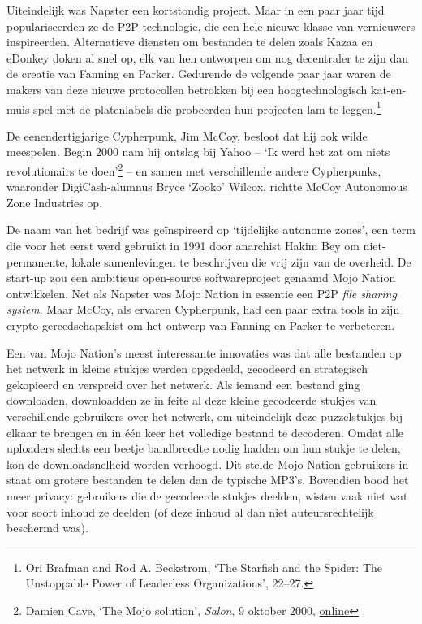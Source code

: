 \documentclass[
  a5paper,
  smalldemyvopaper,11pt,twoside,onecolumn,openright,extrafontsizes]{memoir}
\begin{document}
Uiteindelijk was Napster een kortstondig project. Maar in een paar jaar
tijd populariseerden ze de P2P-technologie, die een hele nieuwe klasse
van vernieuwers inspireerden. Alternatieve diensten om bestanden te
delen zoals Kazaa en eDonkey doken al snel op, elk van hen ontworpen om
nog decentraler te zijn dan de creatie van Fanning en Parker. Gedurende
de volgende paar jaar waren de makers van deze nieuwe protocollen
betrokken bij een hoogtechnologisch kat-en-muis-spel met de platenlabels
die probeerden hun projecten lam te leggen.\footnote{Ori Brafman and Rod
  A. Beckstrom, `The Starfish and the Spider: The Unstoppable Power of
  Leaderless Organizations', 22--27.}

De eenendertigjarige Cypherpunk, Jim McCoy, besloot dat hij ook wilde
meespelen. Begin 2000 nam hij ontslag bij Yahoo -- `Ik werd het zat om
niets revolutionairs te doen'\footnote{Damien Cave, `The Mojo solution',
  \emph{Salon}, 9 oktober 2000,
  \href{https://www.salon.com/2000/10/09/mojo_nation/}{online}} -- en
samen met verschillende andere Cypherpunks, waaronder DigiCash-alumnus
Bryce `Zooko' Wilcox, richtte McCoy Autonomous Zone Industries op.

De naam van het bedrijf was geïnspireerd op `tijdelijke autonome zones',
een term die voor het eerst werd gebruikt in 1991 door anarchist Hakim
Bey om niet-permanente, lokale samenlevingen te beschrijven die vrij
zijn van de overheid. De start-up zou een ambitieus open-source
softwareproject genaamd Mojo Nation ontwikkelen. Net als Napster was
Mojo Nation in essentie een P2P \emph{file sharing system}. Maar McCoy,
als ervaren Cypherpunk, had een paar extra tools in zijn
crypto-gereedschapskist om het ontwerp van Fanning en Parker te
verbeteren.

Een van Mojo Nation's meest interessante innovaties was dat alle
bestanden op het netwerk in kleine stukjes werden opgedeeld, gecodeerd
en strategisch gekopieerd en verspreid over het netwerk. Als iemand een
bestand ging downloaden, downloadden ze in feite al deze kleine
gecodeerde stukjes van verschillende gebruikers over het netwerk, om
uiteindelijk deze puzzelstukjes bij elkaar te brengen en in één keer het
volledige bestand te decoderen. Omdat alle uploaders slechts een beetje
bandbreedte nodig hadden om hun stukje te delen, kon de downloadsnelheid
worden verhoogd. Dit stelde Mojo Nation-gebruikers in staat om grotere
bestanden te delen dan de typische MP3's. Bovendien bood het meer
privacy: gebruikers die de gecodeerde stukjes deelden, wisten vaak niet
wat voor soort inhoud ze deelden (of deze inhoud al dan niet
auteursrechtelijk beschermd was).
\end{document}
